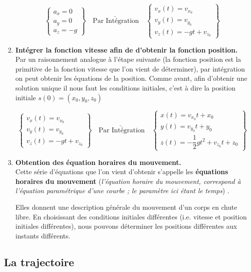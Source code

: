 \documentclass[11pt,a4paper]{article}
\begin{document}
\begin{enumerate}
    \[\begin{Bmatrix} a_x = 0\\ a_y =0\\ a_z =-g\end{Bmatrix} \underrightarrow{\quad \text{Par Intégration}\quad }  \begin{Bmatrix} v_x(t) = v_{x_0}\\ v_y(t)=v_{y_0}\\ v_z(t)=-gt + v_{z_0} \end{Bmatrix}\]
    

    \item \textbf{Intégrer la fonction vitesse afin de d'obtenir la fonction position.}\\
    Par un raisonnement analogue à l'étape suivante (la fonction position est la primitive de la fonction vitesse que l'on vient de déterminer), par intégration on peut obtenir les équations de la position. Comme avant, afin d'obtenir une solution unique il nous faut les conditions initiales, c'est à dire la position initiale $s(0) = (x_0, y_0, z_0)$
    
        \[\begin{Bmatrix} v_x(t) = v_{x_0}\\ v_y(t)=v_{y_0}\\ v_z(t)=-gt + v_{z_0} \end{Bmatrix} \underrightarrow{\quad \text{Par Intégration}\quad }  \begin{Bmatrix} x(t) = v_{x_0}t+x_0\\ y(t)=v_{y_0}t+y_0\\ z(t)=-\dfrac{1}{2}gt^2 + v_{z_0}t + z_0 \end{Bmatrix}\]
        
    \item \textbf{Obtention des équation horaires du mouvement. }\\
    Cette série d’équations que l'on vient d'obtenir s’appelle les \textbf{équations horaires du mouvement} (\textit{l'équation horaire du mouvement, correspond à l’équation paramétrique d'une courbe ; le paramètre ici étant le temps}) . 
    
    Elles donnent une description générale du mouvement d’un corps en chute libre. En choisissant des conditions initiales différentes (i.e. vitesse et position initiales différentes), nous pouvons déterminer les positions différentes aux instants différents. 
\end{enumerate}

\subsection{La trajectoire}
\end{document}
